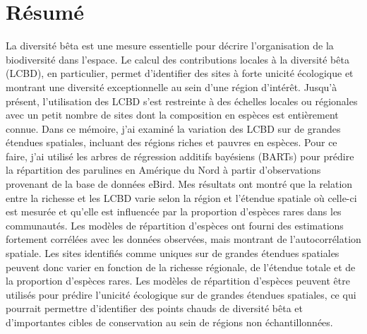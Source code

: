 \documentclass[12pt,twoside,maitrise]{x_template}
\begin{document}
\maketitle

\maketitle


\francais

\chapter*{Résumé}

La diversité bêta est une mesure essentielle pour décrire l'organisation de la biodiversité dans l'espace. Le calcul des contributions locales à la diversité bêta (LCBD), en particulier, permet d'identifier des sites à forte unicité écologique et montrant une diversité exceptionnelle au sein d'une région d'intérêt. Jusqu'à présent, l'utilisation des LCBD s'est restreinte à des échelles locales ou régionales avec un petit nombre de sites dont la composition en espèces est entièrement connue. Dans ce mémoire, j'ai examiné la variation des LCBD sur de grandes étendues spatiales, incluant des régions riches et pauvres en espèces. Pour ce faire, j'ai utilisé les arbres de régression additifs bayésiens (BARTs) pour prédire la répartition des parulines en Amérique du Nord à partir d'observations provenant de la base de données eBird. Mes résultats ont montré que la relation entre la richesse et les LCBD varie selon la région et l'étendue spatiale où celle-ci est mesurée et qu'elle est influencée par la proportion d'espèces rares dans les communautés. Les modèles de répartition d'espèces ont fourni des estimations fortement corrélées avec les données observées, mais montrant de l'autocorrélation spatiale. Les sites identifiés comme uniques sur de grandes étendues spatiales peuvent donc varier en fonction de la richesse régionale, de l'étendue totale et de la proportion d'espèces rares. Les modèles de répartition d'espèces peuvent être utilisés pour prédire l'unicité écologique sur de grandes étendues spatiales, ce qui pourrait permettre d'identifier des points chauds de diversité bêta et d'importantes cibles de conservation au sein de régions non échantillonnées.
\end{document}
